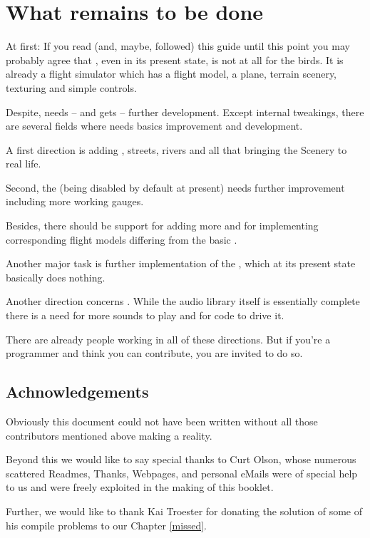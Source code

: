\section{What remains to be done}
At first: If you read (and, maybe, followed) this guide until this
point you may probably agree that \FlightGear\hspace{-2mm}, even
in its present state, is not at all for the birds. It is already a
flight simulator which has a flight model, a plane, terrain
scenery, texturing and simple controls.

Despite, \FlightGear needs -- and gets -- further development. Except internal tweakings,
there are several fields where \FlightGear needs basics improvement and development.


A first direction is adding , streets, rivers and
all that bringing the Scenery to real life.

Second, the  (being disabled by default at present)
needs further improvement including more working gauges.

Besides, there should be support for adding more 
and for implementing corresponding flight models differing from
the basic .

Another major task is further implementation of the , which at its present state basically does nothing.

Another direction concerns . While the audio
library itself is essentially complete there is a need for more
sounds to play and for code to drive it.

There are already people working in all of these directions. But if you're a programmer
and think you can contribute, you are invited to do so.

\subsection*{Achnowledgements}
Obviously this document could not have been written without all
those contributors mentioned above making \FlightGear a reality.

Beyond this we would like to say special thanks to Curt
Olson, whose numerous scattered Readmes,
Thanks, Webpages, and personal eMails were of special help to us
and were freely exploited in the making of this booklet.

Further, we would like to thank Kai Troester for donating the
solution of some of his compile problems to our Chapter \ref{missed}.

